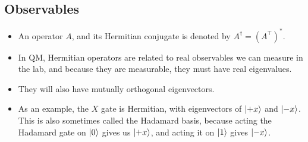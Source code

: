 \subsection{Observables}
\begin{itemize}
	\item An operator \( A \), and its Hermitian conjugate is denoted by \( A^{\dagger} = (A^{\top})^{*} \).
	\item In QM, Hermitian operators are related to real observables we can measure in the lab, and because they are 
		measurable, they must have real eigenvalues.  
	\item They will also have mutually orthogonal eigenvectors. 
	\item As an example, the  \( X \) gate is Hermitian, with eigenvectors of \( \ket{+x} \) and \( \ket{-x} \). This 
		is also sometimes called the Hadamard basis, because acting the Hadamard gate on \( \ket{0} \) gives us 
		\( \ket{+x} \), and acting it on \( \ket{1} \) gives \( \ket{-x} \).  
\end{itemize}

